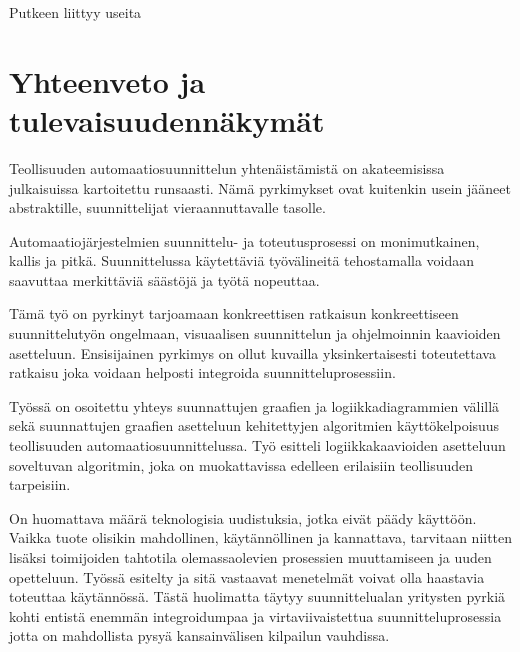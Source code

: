 \documentclass[finnish,12pt]{article}
\begin{document}
Putkeen liittyy useita 




	\clearpage

	\section{Yhteenveto ja tulevaisuudennäkymät}

Teollisuuden automaatiosuunnittelun yhtenäistämistä on akateemisissa julkaisuissa kartoitettu runsaasti.
Nämä pyrkimykset ovat kuitenkin usein jääneet abstraktille, suunnittelijat vieraannuttavalle tasolle.

Automaatiojärjestelmien suunnittelu- ja toteutusprosessi on monimutkainen, kallis ja pitkä.
Suunnittelussa käytettäviä työvälineitä tehostamalla voidaan saavuttaa merkittäviä säästöjä ja työtä nopeuttaa.

Tämä työ on pyrkinyt tarjoamaan konkreettisen ratkaisun konkreettiseen suunnittelutyön ongelmaan, visuaalisen suunnittelun ja ohjelmoinnin kaavioiden asetteluun.
Ensisijainen pyrkimys on ollut kuvailla yksinkertaisesti toteutettava ratkaisu joka voidaan helposti integroida suunnitteluprosessiin.

Työssä on osoitettu yhteys suunnattujen graafien ja logiikkadiagrammien välillä sekä suunnattujen graafien asetteluun kehitettyjen algoritmien käyttökelpoisuus teollisuuden automaatiosuunnittelussa.
Työ esitteli logiikkakaavioiden asetteluun soveltuvan algoritmin, joka on muokattavissa edelleen erilaisiin teollisuuden tarpeisiin.

On huomattava määrä teknologisia uudistuksia, jotka eivät päädy käyttöön.
Vaikka tuote olisikin mahdollinen, käytännöllinen ja kannattava, tarvitaan niitten lisäksi toimijoiden tahtotila olemassaolevien prosessien muuttamiseen ja uuden opetteluun.
Työssä esitelty ja sitä vastaavat menetelmät voivat olla haastavia toteuttaa käytännössä.
Tästä huolimatta täytyy suunnittelualan yritysten pyrkiä kohti entistä enemmän integroidumpaa ja virtaviivaistettua suunnitteluprosessia jotta on mahdollista pysyä kansainvälisen kilpailun vauhdissa.



\clearpage
{}


\end{document}
